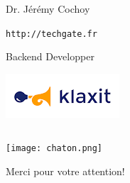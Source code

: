 \documentclass{beamer}
\begin{document}
\begin{frame}
\begin{columns}[T]
\begin{column}{0.5\textwidth}
\begin{block}{Dr. Jérémy Cochoy}
\begin{center}
         \verb!http://techgate.fr!
      \end{center}
      \end{block}
      \begin{block}{Backend Developper}
        \begin{center}
          \includegraphics[scale=0.4]{klaxit}
        \end{center}
      \end{block}
    \end{column}
  \end{columns}
\end{frame}

\begin{frame}
  \begin{center}
    \texttt{[image: chaton.png]}
  \end{center}
  \begin{center}
    Merci pour votre attention!
  \end{center}
\end{frame}
\end{document}
